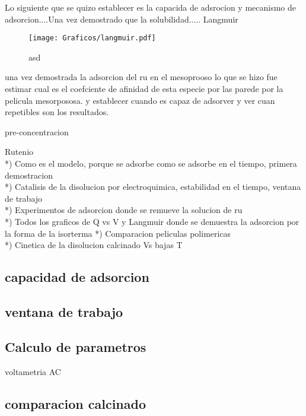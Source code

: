 	Lo siguiente que se quizo establecer es la capacida de adsrocion y mecanismo de adsorcion....Una vez demostrado que la solubilidad..... Langmuir	      	


		    \begin{figure}[ht]
				\centering
		 	    \texttt{[image: Graficos/langmuir.pdf]}
		        \caption[asd]{asd}
		        \label{fig:asd}
		      	\end{figure} 	

	

	una vez demostrada la adsorcion del ru en el mesoprooso lo que se hizo fue estimar cual es el coefciente de afinidad de esta especie por las parede por la pelicula mesorpososa. y establecer cuando es capaz de adsorver y ver cuan repetibles son los resultados.

		
		    
	pre-concentracion

	Rutenio\\
	*) Como es el modelo, porque se adsorbe como se adsorbe en el tiempo, primera demostracion\\
	*) Catalisis de la disolucion por electroquimica, estabilidad en el tiempo, ventana de trabajo\\
	*) Experimentos de adsorcion donde se remueve la solucion de ru\\
	*) Todos los graficos de Q vs V y Langmuir donde se demuestra la adsorcion por la forma de la isorterma 
	*) Comparacion peliculas polimericas\\
	*) Cinetica de la disolucion calcinado Vs bajas T

	
	\subsection{capacidad de adsorcion}

	\subsection{ventana de trabajo}

	\subsection{Calculo de parametros}

	voltametria AC

	\subsection{comparacion calcinado}

